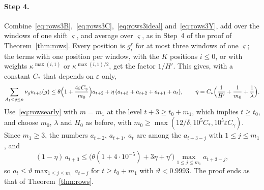 \documentclass[11pt]{amsart}
\theoremstyle{definition}
\theoremstyle{remark}
\newcommand{\eps}{\varepsilon}
\begin{document}
\paragraph{Step 4.} Combine~\eqref{eq:rows3B},~\eqref{eq:rows3C},~\eqref{eq:rows3ideal}
and~\eqref{eq:rows3Y}, add over the windows of one shift $\varsigma$, and average over
$\varsigma$, as in Step~4 of the proof of Theorem~\ref{thm:rows}. Every position is $g^r_i$ for
at most three windows of one $\varsigma$; the terms with one position per window, with the $K$
positions $i\le0$, or with weights $\kappa^{\max(i,1)}$ or $\kappa^{\max(i,1)/2}$, get the factor
$1/H'$. This gives, with a constant $C_*$ that depends on $\eps$ only,
\[
\sum_{A_1<g\le n}\nu_gu_{t+3}(g)\le\theta\Bigl(1+\frac{4\eps C_\gamma}{m_0}\Bigr)a_{t+2}
+\eta\,(a_{t+3}+a_{t+2}+a_{t+1}+a_t),\qquad\eta=C_*\Bigl(\frac1{H'}+\frac1{m_0}+\frac1\lambda\Bigr).
\]
Use~\eqref{eq:rowsearly} with $m=m_1$ at the level $t+3\ge t_0+m_1$, which implies $t\ge t_0$,
and choose $m_0$, $\lambda$ and $H_0$ as before, with
$m_0\ge\max(12/\delta,10^5C_*,10^5\eps C_\gamma)$. Since $m_1\ge3$, the numbers $a_{t+2}$,
$a_{t+1}$, $a_t$ are among the $a_{t+3-j}$ with $1\le j\le m_1$, and
\[
(1-\eta)\,a_{t+3}\le\bigl(\theta(1+4\cdot10^{-5})+3\eta+\eta'\bigr)\max_{1\le j\le m_1}a_{t+3-j},
\]
so $a_t\le\vartheta\max_{1\le j\le m_1}a_{t-j}$ for $t\ge t_0+m_1$ with $\vartheta<0.9993$. The
proof ends as that of Theorem~\ref{thm:rows}.
\end{document}
